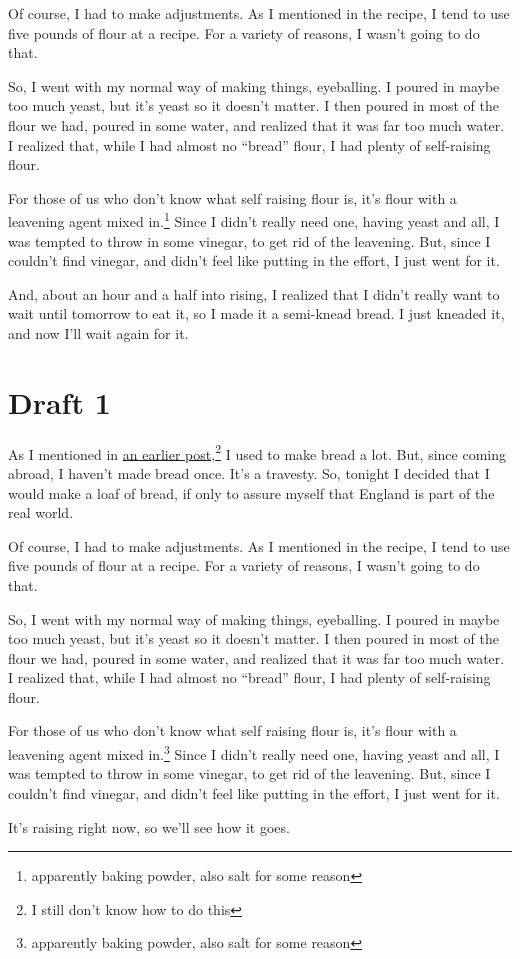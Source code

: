\documentclass[12pt]{article}[titlepage]
\newcommand{\say}[1]{``#1''}
\newcommand{\1}{\={a}}
\newcommand{\2}{\={e}}
\newcommand{\3}{\={\i}}
\newcommand{\4}{\=o}
\newcommand{\5}{\=u}
\newcommand{\6}{\={A}}
\renewcommand{\,}{\textsuperscript{,}}
\begin{document}
Of course, I had to make adjustments.
As I mentioned in the recipe, I tend to use five pounds of flour at a recipe.
For a variety of reasons, I wasn't going to do that.

So, I went with my normal way of making things, eyeballing.
I poured in maybe too much yeast, but it's yeast so it doesn't matter.
I then poured in most of the flour we had, poured in some water, and realized that it was far too much water.
I realized that, while I had almost no \say{bread} flour, I had plenty of self-raising flour.

For those of us who don't know what self raising flour is, it's flour with a leavening agent mixed in.\footnote{apparently baking powder, also salt for some reason}
Since I didn't really need one, having yeast and all, I was tempted to throw in some vinegar, to get rid of the leavening.
But, since I couldn't find vinegar, and didn't feel like putting in the effort, I just went for it.

And, about an hour and a half into rising, I realized that I didn't really want to wait until tomorrow to eat it, so I made it a semi-knead bread.
I just kneaded it, and now I'll wait again for it.
\section{Draft 1}
As I mentioned in \href{basic-bread-recipe.html}{an earlier post},\footnote{I still don't know how to do this} I used to make bread a lot.
But, since coming abroad, I haven't made bread once.
It's a travesty.
So, tonight I decided that I would make a loaf of bread, if only to assure myself that England is part of the real world.

Of course, I had to make adjustments.
As I mentioned in the recipe, I tend to use five pounds of flour at a recipe.
For a variety of reasons, I wasn't going to do that.

So, I went with my normal way of making things, eyeballing.
I poured in maybe too much yeast, but it's yeast so it doesn't matter.
I then poured in most of the flour we had, poured in some water, and realized that it was far too much water.
I realized that, while I had almost no \say{bread} flour, I had plenty of self-raising flour.

For those of us who don't know what self raising flour is, it's flour with a leavening agent mixed in.\footnote{apparently baking powder, also salt for some reason}
Since I didn't really need one, having yeast and all, I was tempted to throw in some vinegar, to get rid of the leavening.
But, since I couldn't find vinegar, and didn't feel like putting in the effort, I just went for it.

It's raising right now, so we'll see how it goes.
\end{document}
